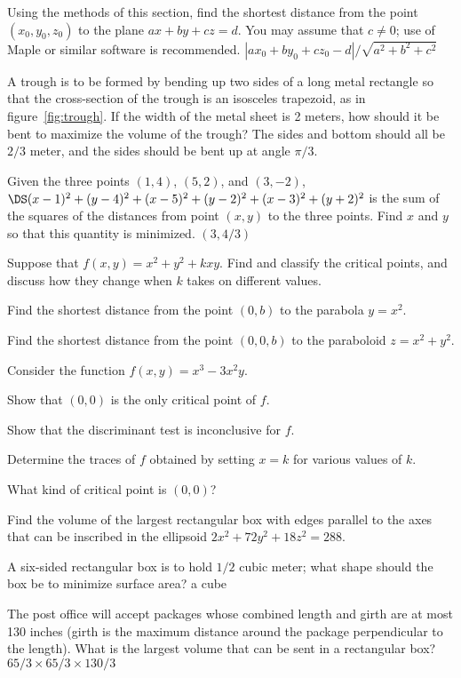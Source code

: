 \begin{multicols}{2}
\problem Using the methods of this section, find the shortest distance from %
the point $(x_0,y_0,z_0)$ to the plane $ax+by+cz=d$.  You may assume that
$c\not=0$; use of Maple or similar software is recommended.  \answer
$|ax_0+by_0+cz_0-d|/\sqrt{a^2+b^2+c^2}$
\endanswer

\problem A trough is to be formed by bending up two sides of a long metal %
rectangle so that the cross-section of the trough is an isosceles
trapezoid, as in figure~\ref{fig:trough}. If the width of the metal sheet
is 2 meters, how should it be bent to maximize the volume of the trough?
\answer The sides and bottom should all be $2/3$ meter, and the sides
should be bent up at angle $\pi/3$.
\endanswer

\problem Given the three points $(1,4)$, $(5,2)$, and $(3,-2)$, %
$\DS(x-1)^2+(y-4)^2+(x-5)^2+(y-2)^2+(x-3)^2+(y+2)^2$ is the sum of the
squares of the distances from point $(x,y)$ to the three points. Find $x$
and $y$ so that this quantity is minimized.  \answer $(3,4/3)$
\endanswer

\problem Suppose that $f(x,y)=x^2+y^2+kxy$. Find and classify the critical %
points, and discuss how they change when $k$ takes on different values.

\problem Find the shortest distance from the point $(0,b)$ to the parabola %
$y=x^2$.

\problem Find the shortest distance from the point $(0,0,b)$ to the %
paraboloid $z=x^2+y^2$.

\problem Consider the function $f(x,y)=x^3-3x^2y$. %

\subprob Show that $(0,0)$ is the only critical point of $f$.

\subprob Show that the discriminant test is inconclusive for $f$.

\subprob Determine the traces of $f$ obtained by setting $x=k$ for various
values of $k$.

\subprob What kind of critical point is $(0,0)$?


\problem Find the volume of the largest rectangular box with edges parallel %
to the axes that can be inscribed in the ellipsoid $2x^2+72y^2+18z^2=288$.





\problem A six-sided rectangular box is to hold $1/2$ cubic meter; what %
shape should the box be to minimize surface area?  \answer a cube
\endanswer

\problem The post office will accept packages whose combined length and %
girth are at most 130 inches (girth is the maximum distance around the
package perpendicular to the length). What is the largest volume that can
be sent in a rectangular box?  \answer $65/3\times 65/3\times 130/3$
\endanswer


\end{multicols}
